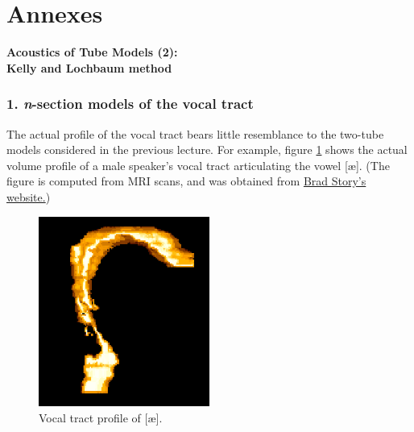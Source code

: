 \chapter*{Annexes}


{}
\thispagestyle{empty}

{\LARGE \textbf{Acoustics of Tube Models (2):\\ Kelly and Lochbaum method}}\label{atm}

\subsection*{1. \textit{n}-section models of the vocal tract}

The actual profile of the vocal tract bears little resemblance to the two-tube models considered in the previous lecture. For example, figure \ref{f1} shows the actual volume profile of a male speaker's vocal tract articulating the vowel {[}\ae {]}. (The figure is computed from MRI scans, and was obtained from \href{https://slhs.arizona.edu/person/brad-story-phd}{Brad Story's website.})

\captionsetup[figure]{list=no}
\setcounter{figure}{0}
\makeatletter 
\renewcommand{\thefigure}{\@arabic\c@figure}
\makeatother

\begin{figure}[htbp]
\begin{center}
\includegraphics[width=0.5\textwidth]{mp/img/male-ae.png}
\caption{Vocal tract profile of {[}\ae {]}.}
\label{f1}
\end{center}
\end{figure}

\newpage 

